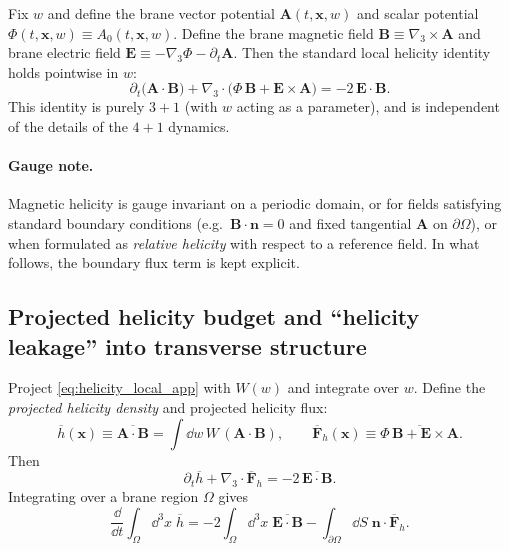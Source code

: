 \documentclass[11pt]{article}
\begin{document}
Fix \(w\) and define the brane vector potential \(\mathbf{A}(t,\mathbf{x},w)\) and scalar
potential \(\Phi(t,\mathbf{x},w)\equiv A_0(t,\mathbf{x},w)\). Define the brane magnetic field
\(\mathbf{B}\equiv \nabla_3\times\mathbf{A}\) and brane electric field
\(\mathbf{E}\equiv -\nabla_3\Phi-\partial_t\mathbf{A}\). Then the standard local helicity identity
holds pointwise in \(w\):
\begin{equation}
\partial_t\!\big(\mathbf{A}\cdot\mathbf{B}\big)
+
\nabla_3\cdot\Big(\Phi\,\mathbf{B}+\mathbf{E}\times\mathbf{A}\Big)
=
-2\,\mathbf{E}\cdot\mathbf{B}.
\label{eq:helicity_local_app}
\end{equation}
This identity is purely \(3+1\) (with \(w\) acting as a parameter), and is independent of the
details of the \(4+1\) dynamics.

\paragraph{Gauge note.}
Magnetic helicity is gauge invariant on a periodic domain, or for fields satisfying standard
boundary conditions (e.g.\ \(\mathbf{B}\cdot \mathbf{n}=0\) and fixed tangential \(\mathbf{A}\)
on \(\partial\Omega\)), or when formulated as \emph{relative helicity} with respect to a
reference field. In what follows, the boundary flux term is kept explicit.

\subsection{Projected helicity budget and ``helicity leakage'' into transverse structure}
\label{app:proj_helicity_budget}

Project \eqref{eq:helicity_local_app} with \(W(w)\) and integrate over \(w\). Define the
\emph{projected helicity density} and projected helicity flux:
\begin{equation}
\overline{h}(\mathbf{x})
\equiv
\overline{\mathbf{A}\cdot\mathbf{B}}
=
\int \dd w\,W\,(\mathbf{A}\cdot\mathbf{B}),
\qquad
\overline{\mathbf{F}}_h(\mathbf{x})
\equiv
\overline{\Phi\,\mathbf{B}+\mathbf{E}\times\mathbf{A}}.
\label{eq:proj_helicity_defs_app}
\end{equation}
Then
\begin{equation}
\partial_t \overline{h}
+
\nabla_3\cdot \overline{\mathbf{F}}_h
=
-2\,\overline{\mathbf{E}\cdot\mathbf{B}}.
\label{eq:proj_helicity_local_app}
\end{equation}
Integrating over a brane region \(\Omega\) gives
\begin{equation}
\frac{\dd}{\dd t}\int_{\Omega}\dd^3x\;\overline{h}
=
-2\int_{\Omega}\dd^3x\;\overline{\mathbf{E}\cdot\mathbf{B}}
-\int_{\partial\Omega}\dd S\; \mathbf{n}\cdot \overline{\mathbf{F}}_h.
\label{eq:proj_helicity_integral_app}
\end{equation}
\end{document}
